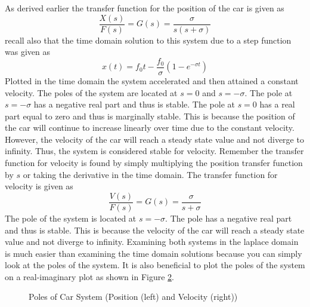 As derived earlier the transfer function for the position of the car is given as 
\begin{equation}
    \frac{X(s)}{F(s)}= G(s) = \frac{\sigma}{s(s+\sigma)}
\end{equation}
recall also that the time domain solution to this system due to a step function was given as 
\begin{equation}
    x(t) = f_0 t - \frac{f_0}{\sigma} (1 - e^{-\sigma t})
\end{equation}
Plotted in the time domain the system accelerated and then attained a constant velocity. The poles of the system are located at $s=0$ and $s=-\sigma$. The pole at $s=-\sigma$ has a negative real part and thus is stable. The pole at $s=0$ has a real part equal to zero and thus is marginally stable. This is because the position of the car will continue to increase linearly over time due to the constant velocity. However, the velocity of the car will reach a steady state value and not diverge to infinity. Thus, the system is considered stable for velocity. Remember the transfer function for velocity is found by simply multiplying the position transfer function by $s$ or taking the derivative in the time domain. The transfer function for velocity is given as
\begin{equation}
    \frac{V(s)}{F(s)}= G(s) = \frac{\sigma}{s+\sigma}
\end{equation}
The pole of the system is located at $s=-\sigma$. The pole has a negative real part and thus is stable. This is because the velocity of the car will reach a steady state value and not diverge to infinity. Examining both systems in the laplace domain is much easier than examining the time domain solutions because you can simply look at the poles of the system. It is also beneficial to plot the poles of the system on a real-imaginary plot as shown in Figure \ref{f:car_poles}.

\begin{figure}[H]
\centering
\begin{subfigure}[b]{0.48\textwidth}
\centering
\end{subfigure}
\hfill
\begin{subfigure}[b]{0.48\textwidth}
\centering
\label{fig:two}
\end{subfigure}
\caption{Poles of Car System (Position (left) and Velocity (right))}
\label{f:car_poles}
\end{figure}

